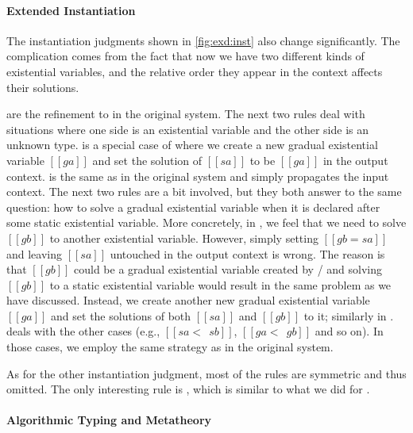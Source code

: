 \paragraph{Extended Instantiation}

The instantiation judgments shown in \cref{fig:exd:inst} also change
significantly. The complication comes from the fact that now we have two different
kinds of existential variables, and the relative order they appear in the
context affects their solutions.


 are the refinement to  in
the original system. The next two rules deal with situations where one side is
an existential variable and the other side is an unknown type.
 is a special case of  where we create a
new gradual existential variable $[[ga]]$ and set the solution of $[[sa]]$ to be
$[[ga]]$ in the output context.  is the same as
 in the original system and simply propagates the input
context. The next two rules  are a bit
involved, but they both answer to the same question: how to solve a gradual
existential variable when it is declared after some static existential variable.
More concretely, in , we feel that we need to solve
$[[gb]]$ to another existential variable. However, simply setting $[[ gb = sa]]$ and leaving $[[sa]]$ untouched
in the output context is wrong. The reason is that $[[gb]]$ could be a gradual existential
variable created by / and solving $[[gb]]$ to a static existential
variable would result in the same problem as we have discussed. Instead, we create another new gradual
existential variable $[[ga]]$ and set the solutions of both $[[sa]]$ and $[[gb]]$ to it; similarly in .
 deals with the other cases (e.g., $[[ sa <~~ sb  ]]$, $[[ ga <~~ gb  ]]$ and so on).
In those cases, we employ the same strategy as in the original system.

As for the other instantiation judgment, most of the rules are symmetric and thus omitted.
The only interesting rule is , which is similar to what we did for .



\paragraph{Algorithmic Typing and Metatheory}

